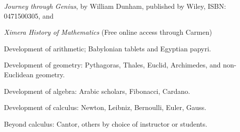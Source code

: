 \documentclass{osucourse}
\begin{document}
\CatalogDescription
\PrerequisitesAndExclusions

\begin{Text}
\emph{Journey through Genius}, by William Dunham, published by Wiley,
ISBN: 0471500305, and

\emph{Ximera History of Mathematics} (Free online access through Carmen)
\end{Text}

\begin{TopicsList}
\item
  Development of arithmetic; Babylonian tablets and Egyptian papyri.
\item
  Development of geometry: Pythagoras, Thales, Euclid, Archimedes, and
  non-Euclidean geometry.
\item
  Development of algebra: Arabic scholars, Fibonacci, Cardano.
\item
  Development of calculus: Newton, Leibniz, Bernoulli, Euler, Gauss.
\item
  Beyond calculus: Cantor, others by choice of instructor or students.
\end{TopicsList}

\begin{SuggestedSchedule}
\end{SuggestedSchedule}
\end{document}
